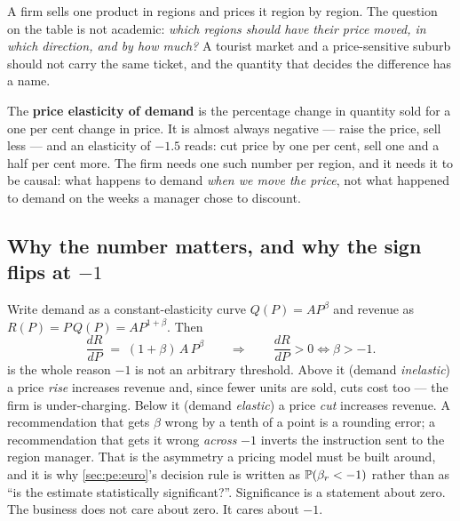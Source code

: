 A firm sells one product in \nbThreeNRegions{} regions and prices it region by region. The
question on the table is not academic: \emph{which regions should have their price moved, in
which direction, and by how much?} A tourist market and a price-sensitive suburb should not carry
the same ticket, and the quantity that decides the difference has a name.

The \textbf{price elasticity of demand} is the percentage change in quantity sold for a one per
cent change in price. It is almost always negative --- raise the price, sell less --- and an
elasticity of $-1.5$ reads: cut price by one per cent, sell one and a half per cent more. The
firm needs one such number per region, and it needs it to be causal: what happens to demand
\emph{when we move the price}, not what happened to demand on the weeks a manager chose to
discount.

\subsection*{Why the number matters, and why the sign flips at \texorpdfstring{$-1$}{-1}}

Write demand as a constant-elasticity curve $Q(P) = A P^{\beta}$ and revenue as
$R(P) = P\,Q(P) = A P^{1+\beta}$. Then
%
\begin{equation}
  \frac{dR}{dP} \;=\; (1+\beta)\, A\, P^{\beta}
  \qquad\Longrightarrow\qquad
  \frac{dR}{dP} > 0 \iff \beta > -1 .
  \label{eq:pe:revenue}
\end{equation}
%
 is the whole reason $-1$ is not an arbitrary threshold. Above it (demand
\emph{inelastic}) a price \emph{rise} increases revenue and, since fewer units are sold, cuts cost
too --- the firm is under-charging. Below it (demand \emph{elastic}) a price \emph{cut} increases
revenue. A recommendation that gets $\beta$ wrong by a tenth of a point is a rounding error; a
recommendation that gets it wrong \emph{across} $-1$ inverts the instruction sent to the region
manager. That is the asymmetry a pricing model must be built around, and it is why
\cref{sec:pe:euro}'s decision rule is written as $\operatorname{\mathbb{P}}(\beta_r < -1)$ rather than as ``is the
estimate statistically significant?''. Significance is a statement about zero. The business does
not care about zero. It cares about $-1$.

